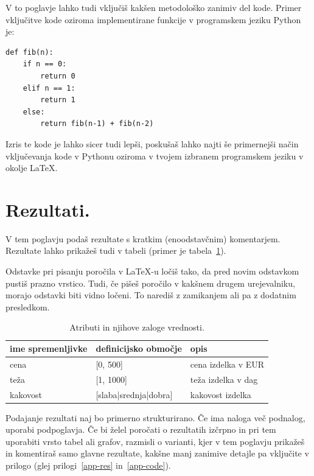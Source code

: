 \documentclass[a4paper,11pt]{article}
\begin{document}
V to poglavje lahko tudi vključiš kakšen metodološko zanimiv del
kode. Primer vključitve kode oziroma implementirane funkcije v
programskem jeziku Python je:

\begin{lstlisting}
def fib(n):
    if n == 0:
        return 0
    elif n == 1:
        return 1
    else:
        return fib(n-1) + fib(n-2)
\end{lstlisting}

Izris te kode je lahko sicer tudi lepši, poskušaš lahko najti še
primernejši način vključevanja kode v Pythonu oziroma v tvojem izbranem
programskem jeziku v okolje \LaTeX{}.

\section{Rezultati.}

V tem poglavju podaš rezultate s kratkim (enoodstavčnim)
komentarjem. Rezultate lahko prikažeš tudi v tabeli (primer je
tabela~\ref{tab1}).

Odstavke pri pisanju poročila v LaTeX-u ločiš tako, da pred novim
odstavkom pustiš prazno vrstico. Tudi, če pišeš poročilo v kakšnem
drugem urejevalniku, morajo odstavki biti vidno ločeni. To narediš z
zamikanjem ali pa z dodatnim presledkom.

\begin{table}[htbp]
\caption{Atributi in njihove zaloge vrednosti.}
\label{tab1}
\begin{center}
\begin{tabular}{llp{3cm}}
\hline
ime spremenljivke & definicijsko območje & opis \\
\hline
cena & [0, 500] & cena izdelka v EUR\\
teža & [1, 1000] & teža izdelka v dag \\
kakovost & [slaba|srednja|dobra] & kakovost izdelka \\
\hline
\end{tabular}
\end{center}
\end{table}

Podajanje rezultati naj bo primerno strukturirano. Če ima naloga več
podnalog, uporabi podpoglavja. Če bi želel poročati o rezultatih
izčrpno in pri tem uporabiti vrsto tabel ali grafov, razmisli o
varianti, kjer v tem poglavju prikažeš in komentiraš samo glavne
rezultate, kakšne manj zanimive detajle pa vključite v prilogo (glej
prilogi~\ref{app-res} in~\ref{app-code}).
\end{document}

